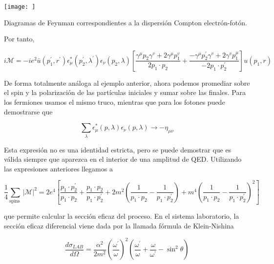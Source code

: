 \begin{marginfigure}[]
  \texttt{[image: ]}
  \caption[]{Diagramas de Feynman correspondientes a la dispersión Compton electrón-fotón.}
\end{marginfigure}

Por tanto,

\begin{equation*}
i \mathscr{M}=-i e^{2} \bar{u}\left(p_{1}^{\prime}, r^{\prime}\right) \epsilon_{\mu}^{*}\left(p_{2}^{\prime}, \lambda^{\prime}\right) \epsilon_{\nu}\left(p_{2}, \lambda\right)\left[\frac{\gamma^{\mu} p_{2} \gamma^{v}+2 \gamma^{\mu} p_{1}^{v}}{2 p_{1} \cdot p_{2}}+\frac{-\gamma^{\mu} p_{2}^{\prime} \gamma^{v}+2 \gamma^{v} p_{1}^{\mu}}{-2 p_{1} \cdot p_{2}^{\prime}}\right] u\left(p_{1}, r\right) \tag{8.31}
\end{equation*}


De forma totalmente análoga al ejemplo anterior, ahora podemos promediar sobre el spin y la polarización de las partículas iniciales y sumar sobre las finales. Para los fermiones usamos el mismo truco, mientras que para los fotones puede demostrarse que

\begin{equation*}
\sum_{\lambda} \epsilon_{\mu}^{*}(p, \lambda) \epsilon_{\nu}(p, \lambda) \rightarrow-\eta_{\mu \nu} \tag{8.32}
\end{equation*}


Esta expresión no es una identidad estricta, pero se puede demostrar que es válida siempre que aparezca en el interior de una amplitud de QED. Utilizando las expresiones anteriores llegamos a

\begin{equation*}
\frac{1}{4} \sum_{\text {spins }}|\mathscr{M}|^{2}=2 e^{4}\left[\frac{p_{1} \cdot p_{2}^{\prime}}{p_{1} \cdot p_{2}}+\frac{p_{1} \cdot p_{2}}{p_{1} \cdot p_{2}^{\prime}}+2 m^{2}\left(\frac{1}{p_{1} \cdot p_{2}}-\frac{1}{p_{1} \cdot p_{2}^{\prime}}\right)+m^{4}\left(\frac{1}{p_{1} \cdot p_{2}}-\frac{1}{p_{1} \cdot p_{2}^{\prime}}\right)^{2}\right] \tag{8.33}
\end{equation*}

que permite calcular la sección eficaz del proceso. En el sistema laboratorio, la sección eficaz diferencial viene dada por la llamada fórmula de Klein-Nishina

\begin{equation*}
\frac{d \sigma_{L A B}}{d \Omega}=\frac{\alpha^{2}}{2 m^{2}}\left(\frac{\omega^{\prime}}{\omega}\right)^{2}\left(\frac{\omega^{\prime}}{\omega}+\frac{\omega}{\omega^{\prime}}-\sin ^{2} \theta\right) \tag{8.34}
\end{equation*}

